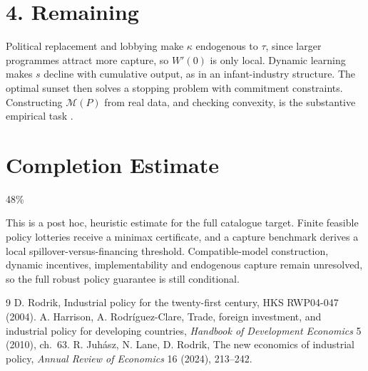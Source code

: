 \documentclass[11pt]{article}
\theoremstyle{definition}
\begin{document}
\section*{4. Remaining}
Political replacement and lobbying make $\kappa$ endogenous to $\tau$, since larger programmes attract more capture, so
$W'(0)$ is only local. Dynamic learning makes $s$ decline with cumulative output, as in an infant-industry structure. The
optimal sunset then solves a stopping problem with commitment constraints. Constructing $\mathcal M(P)$ from real data,
and checking convexity, is the substantive empirical task \cite{rodrik,hrc,jlr}.

\section{Completion Estimate}
48\%

This is a post hoc, heuristic estimate for the full catalogue target.
Finite feasible policy lotteries receive a minimax certificate, and a capture benchmark derives a local spillover-versus-financing threshold. Compatible-model construction, dynamic incentives, implementability and endogenous capture remain unresolved, so the full robust policy guarantee is still conditional.

\begin{thebibliography}{9}
 D. Rodrik, Industrial policy for the twenty-first century, HKS RWP04-047 (2004).
 A. Harrison, A. Rodr\'iguez-Clare, Trade, foreign investment, and industrial policy for developing countries, \emph{Handbook of Development Economics} 5 (2010), ch.~63.
 R. Juh\'asz, N. Lane, D. Rodrik, The new economics of industrial policy, \emph{Annual Review of Economics} 16 (2024), 213--242.
\end{thebibliography}
\end{document}
